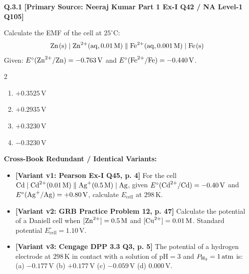 \begin{problembox}
\textbf{Q.3.1} \hfill \textbf{[Primary Source: Neeraj Kumar Part 1 Ex-I Q42 / NA Level-1 Q105]}
\label{q:qb-c3-01}

Calculate the EMF of the cell at $25^\circ\text{C}$:
\begin{equation*}
    \ce{Zn(s)} \mid \ce{Zn^2+(aq, } 0.01\,\text{M}\ce{)} \parallel \ce{Fe^2+(aq, } 0.001\,\text{M}\ce{)} \mid \ce{Fe(s)}
\end{equation*}
Given: $E^\circ(\ce{Zn^2+/Zn}) = -0.763\,\text{V}$ and $E^\circ(\ce{Fe^2+/Fe}) = -0.440\,\text{V}$.
\begin{multicols}{2}
\begin{enumerate}[label=(\alph*)]
    \item $+0.3525\,\text{V}$
    \item $+0.2935\,\text{V}$
    \item $+0.3230\,\text{V}$
    \item $-0.3230\,\text{V}$
\end{enumerate}
\end{multicols}

\tcbline
\textbf{\color{accentamber}Cross-Book Redundant / Identical Variants:}
\begin{itemize}[leftmargin=*,itemsep=2pt]
    \item \textbf{[Variant v1: Pearson Ex-I Q45, p. 4]} For the cell $\ce{Cd} \mid \ce{Cd^2+}(0.01\,\text{M}) \parallel \ce{Ag+}(0.5\,\text{M}) \mid \ce{Ag}$, given $E^\circ(\ce{Cd^2+/Cd}) = -0.40\,\text{V}$ and $E^\circ(\ce{Ag+/Ag}) = +0.80\,\text{V}$, calculate $E_{\text{cell}}$ at $298\,\text{K}$.
    \item \textbf{[Variant v2: GRB Practice Problem 12, p. 47]} Calculate the potential of a Daniell cell when $[\ce{Zn^2+}] = 0.5\,\text{M}$ and $[\ce{Cu^2+}] = 0.01\,\text{M}$. Standard potential $E^\circ_{\text{cell}} = 1.10\,\text{V}$.
    \item \textbf{[Variant v3: Cengage DPP 3.3 Q3, p. 5]} The potential of a hydrogen electrode at $298\,\text{K}$ in contact with a solution of $\text{pH} = 3$ and $P_{\ce{H2}} = 1\,\text{atm}$ is: (a) $-0.177\,\text{V}$ (b) $+0.177\,\text{V}$ (c) $-0.059\,\text{V}$ (d) $0.000\,\text{V}$.
\end{itemize}
\end{problembox}

